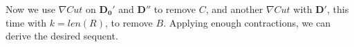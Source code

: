 		Now we use $\nabla Cut$ on $\mathbf{D_0}'$ and $\mathbf{D}''$ to remove $C$, and another $\nabla Cut$ with $\mathbf{D}'$, this time with $k = len(R)$, to remove $B$. Applying enough contractions, we can derive the desired sequent.
		\begin{prooftree}
			\noLine


			\noLine

			\noLine







			\doubleLine {}
		\end{prooftree}